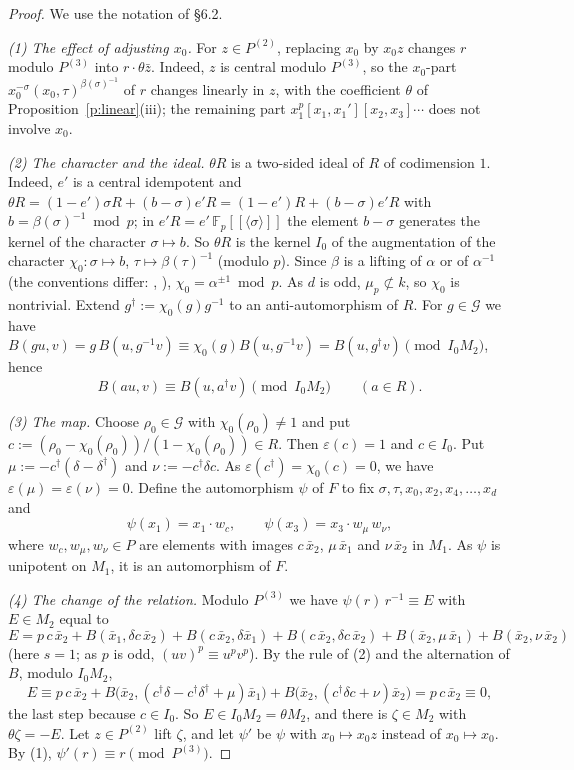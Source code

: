 \documentclass[11pt,a4paper]{article}
\newcommand{\Fp}{\mathbb{F}_p}
\newcommand{\cG}{\mathcal{G}}
\newcommand{\xb}{\bar x}
\theoremstyle{plain}
\theoremstyle{definition}
\theoremstyle{remark}
\begin{document}
\begin{proof}
We use the notation of \S6.2.

\emph{(1) The effect of adjusting $x_0$.} For $z\in P^{(2)}$, replacing $x_0$ by $x_0z$ changes $r$ modulo $P^{(3)}$
into $r\cdot\theta\bar z$. Indeed, $z$ is central modulo $P^{(3)}$, so the $x_0$-part
$x_0^{-\sigma}(x_0,\tau)^{\beta(\sigma)^{-1}}$ of $r$ changes linearly in $z$, with the coefficient $\theta$ of
Proposition~\ref{p:linear}(iii); the remaining part $x_1^{p}[x_1,x_1'][x_2,x_3]\cdots$ does not involve $x_0$.

\emph{(2) The character and the ideal.} $\theta R$ is a two-sided ideal of $R$ of codimension $1$. Indeed, $e'$ is a
central idempotent and $\theta R=(1-e')\sigma R+(b-\sigma)e'R=(1-e')R+(b-\sigma)e'R$ with $b=\beta(\sigma)^{-1}\bmod
p$; in $e'R=e'\,\Fp[[\langle\sigma\rangle]]$ the element $b-\sigma$ generates the kernel of the character
$\sigma\mapsto b$. So $\theta R$ is the kernel $I_0$ of the augmentation of the character $\chi_0\colon\sigma\mapsto
b$, $\tau\mapsto\beta(\tau)^{-1}$ (modulo $p$). Since $\beta$ is a lifting of $\alpha$ or of $\alpha^{-1}$ (the
conventions differ: \cite[pp.~74--75]{JW}, \cite[p.~420]{NSW}), $\chi_0=\alpha^{\pm1}\bmod p$. As $d$ is odd,
$\mu_p\not\subset k$, so $\chi_0$ is nontrivial. Extend $g^{\dagger}:=\chi_0(g)g^{-1}$ to an anti-automorphism of $R$.
For $g\in\cG$ we have $B(gu,v)=g\,B(u,g^{-1}v)\equiv\chi_0(g)B(u,g^{-1}v)=B(u,g^{\dagger}v)\pmod{I_0M_2}$, hence
\[
B(au,v)\equiv B(u,a^{\dagger}v)\pmod{I_0M_2}\qquad(a\in R).
\]

\emph{(3) The map.} Choose $\rho_0\in\cG$ with $\chi_0(\rho_0)\ne1$ and put
$c:=(\rho_0-\chi_0(\rho_0))/(1-\chi_0(\rho_0))\in R$. Then $\varepsilon(c)=1$ and $c\in I_0$. Put
$\mu:=-c^{\dagger}(\delta-\delta^{\dagger})$ and $\nu:=-c^{\dagger}\delta c$. As $\varepsilon(c^{\dagger})=\chi_0(c)=0$,
we have $\varepsilon(\mu)=\varepsilon(\nu)=0$. Define the automorphism $\psi$ of $F$ to fix
$\sigma,\tau,x_0,x_2,x_4,\dots,x_d$ and
\[
\psi(x_1)=x_1\cdot w_c,\qquad\psi(x_3)=x_3\cdot w_\mu\,w_\nu ,
\]
where $w_c,w_\mu,w_\nu\in P$ are elements with images $c\,\xb_2$, $\mu\,\xb_1$ and $\nu\,\xb_2$ in $M_1$. As
$\psi$ is unipotent on $M_1$, it is an automorphism of $F$.

\emph{(4) The change of the relation.} Modulo $P^{(3)}$ we have $\psi(r)\,r^{-1}\equiv E$ with $E\in M_2$ equal to
\[
E=p\,c\,\xb_2+B(\xb_1,\delta c\,\xb_2)+B(c\,\xb_2,\delta\xb_1)+B(c\,\xb_2,\delta c\,\xb_2)
+B(\xb_2,\mu\,\xb_1)+B(\xb_2,\nu\,\xb_2)
\]
(here $s=1$; as $p$ is odd, $(uv)^p\equiv u^pv^p$). By the rule of (2) and the alternation of $B$, modulo $I_0M_2$,
\[
E\equiv p\,c\,\xb_2+B\bigl(\xb_2,(c^{\dagger}\delta-c^{\dagger}\delta^{\dagger}+\mu)\xb_1\bigr)
+B\bigl(\xb_2,(c^{\dagger}\delta c+\nu)\xb_2\bigr)=p\,c\,\xb_2\equiv0,
\]
the last step because $c\in I_0$. So $E\in I_0M_2=\theta M_2$, and there is $\zeta\in M_2$ with $\theta\zeta=-E$. Let
$z\in P^{(2)}$ lift $\zeta$, and let $\psi'$ be $\psi$ with $x_0\mapsto x_0z$ instead of $x_0\mapsto x_0$. By (1),
$\psi'(r)\equiv r\pmod{P^{(3)}}$.


\end{proof}
\end{document}
